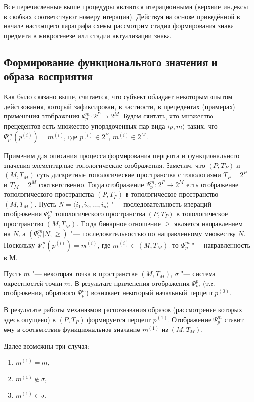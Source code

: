 Все перечисленные выше процедуры являются итерационными (верхние индексы в скобках соответствуют номеру итерации). Действуя на основе приведённой в начале настоящего параграфа схемы рассмотрим стадии формирования знака предмета в микрогенезе или стадии актуализации знака.

\subsection{Формирование функционального значения и образа восприятия} 

Как было сказано выше, считается, что субъект обладает некоторым опытом действования, который зафиксирован, в частности, в прецедентах (примерах) применения отображения $\Psi_p^m:2^P\rightarrow 2^M$. Будем считать, что множество прецедентов есть множество упорядоченных пар вида $\langle p,m\rangle$ таких, что $\Psi_p^m(p^{(i)})=m^{(i)}$, где $p^{(i)}\in 2^P$, $m^{(i)}\in 2^M$.

Применим для описания процесса формирования перцепта и функционального значения элементарные топологические соображения. Заметим, что $(P, T_P)$ и $(M, T_M)$ суть дискретные топологические пространства с топологиями $T_P=2^P$ и $T_M=2^M$ соответственно. Тогда отображение $\Psi_p^m: 2^P\rightarrow 2^M$ есть отображение топологического пространства $(P, T_P)$ в топологическое пространство $(M, T_M)$. Пусть $N=\langle i_1,i_2,\dots,i_n\rangle$ "--- последовательность итераций отображения $\Psi_p^m$ топологического пространства $(P, T_P)$ в топологическое пространство $(M, T_M)$. Тогда бинарное отношение $\geqslant$ является направлением на $N$, а $(\Psi_p^m | N, \geqslant)$ "--- последовательностью по направленному множеству $N$. Поскольку $\Psi_p^m(p^{(i)})=m^{(i)}$, где $m^{(i)}\in (M,T_M)$, то $\Psi_p^m$  "--- направленность в $М$.

Пусть $m$ "--- некоторая точка в пространстве $(M,T_M)$, $\sigma$ "--- система окрестностей точки $m$. В результате применения отображения $\Psi_m^p$ (т.е. отображения, обратного $\Psi_p^m$) возникает некоторый начальный перцепт $p^{(0)}$.

В результате работы механизмов распознавания образов (рассмотрение которых здесь опущено) в $(P,T_P)$ формируется перцепт $p^{(1)}$. Отображение $\Psi_p^m$ ставит ему в соответствие функциональное значение $m^{(1)}$ из $(M,T_M)$.

Далее возможны три случая:
\begin{enumerate}
	\item\label{choise_1} $m^{(1)}=m$,
	\item\label{choise_2} $m^{(1)}\not\in\sigma$,
	\item\label{choise_3} $m^{(1)}\in\sigma$.
\end{enumerate}

